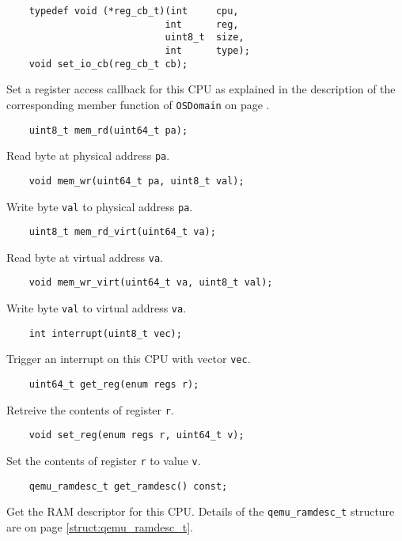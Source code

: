 \documentclass[letterpaper, 10pt]{book}
\begin{document}
\begin{verbatim}                                                               
    typedef void (*reg_cb_t)(int     cpu,
                            int      reg,
                            uint8_t  size,
                            int      type);
    void set_io_cb(reg_cb_t cb); 
\end{verbatim}
Set a register access callback for this CPU as explained in the description of
the corresponding member function of \texttt{OSDomain} on page
\pageref{func:set_reg_cb}.


\begin{verbatim}
    uint8_t mem_rd(uint64_t pa);
\end{verbatim}
Read byte at physical address \texttt{pa}.

\begin{verbatim}
    void mem_wr(uint64_t pa, uint8_t val);
\end{verbatim}
Write byte \texttt{val} to physical address \texttt{pa}.

\begin{verbatim}
    uint8_t mem_rd_virt(uint64_t va);
\end{verbatim}
Read byte at virtual address \texttt{va}.

\begin{verbatim}
    void mem_wr_virt(uint64_t va, uint8_t val);
\end{verbatim}
Write byte \texttt{val} to virtual address \texttt{va}.

\begin{verbatim}
    int interrupt(uint8_t vec);
\end{verbatim}
Trigger an interrupt on this CPU with vector \texttt{vec}.

\begin{verbatim}
    uint64_t get_reg(enum regs r);
\end{verbatim}
Retreive the contents of register \texttt{r}.

\begin{verbatim}
    void set_reg(enum regs r, uint64_t v);
\end{verbatim}
Set the contents of register \texttt{r} to value \texttt{v}.

\begin{verbatim}
    qemu_ramdesc_t get_ramdesc() const;
\end{verbatim}
Get the RAM descriptor for this CPU. Details of the \texttt{qemu\_ramdesc\_t}
structure are on page \ref{struct:qemu_ramdesc_t}.
\newpage
\end{document}
